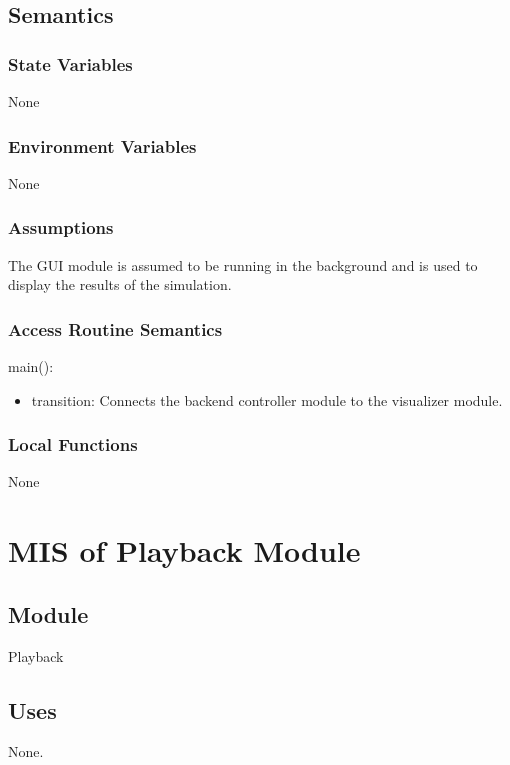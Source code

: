 \documentclass[12pt, titlepage]{article}
\begin{document}
\subsection{Semantics}

\subsubsection{State Variables}

None

\subsubsection{Environment Variables}

None

\subsubsection{Assumptions}


The GUI module is assumed to be running in the background and is used to display the results of the simulation.

\subsubsection{Access Routine Semantics}

\noindent main():
\begin{itemize}
\item transition: Connects the backend controller module to the visualizer module.
\end{itemize}


\subsubsection{Local Functions}

None

\newpage

\section{MIS of Playback Module} \label{Module_playback} 


\subsection{Module}

Playback

\subsection{Uses}
None.
\end{document}
